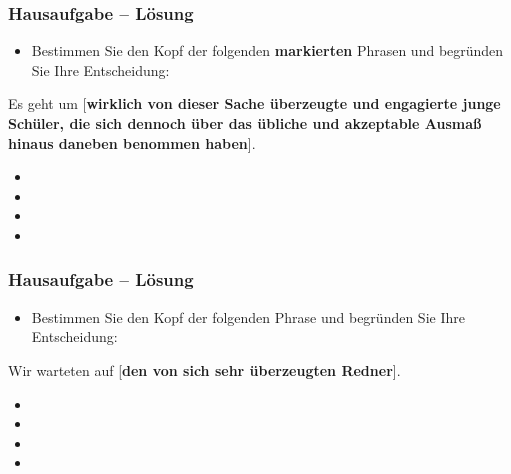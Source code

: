 
\begin{frame}
\frametitle{Hausaufgabe -- Lösung} 

\begin{itemize}
	\item Bestimmen Sie den Kopf der folgenden \textbf{markierten} Phrasen und begründen Sie Ihre Entscheidung:
\end{itemize}
	
	\ea Es geht um [\textbf{wirklich von dieser Sache überzeugte und engagierte junge Schüler, die sich dennoch über das übliche und akzeptable Ausmaß hinaus daneben benommen haben}].
	\z

\pause 

	
\begin{itemize}
	\item {}
	\item {}
	\item {}
	\item {}
\end{itemize}

	
\end{frame}


\begin{frame}
\frametitle{Hausaufgabe -- Lösung} 

\begin{itemize}
	\item Bestimmen Sie den Kopf der folgenden Phrase und begründen Sie Ihre Entscheidung:
\end{itemize}

\ea Wir warteten auf [\textbf{den von sich sehr überzeugten Redner}].
\z 

\pause 

\begin{itemize}
	\item {}
	\item {}
	\item {}
	\item {}
\end{itemize}
	
	
\end{frame}


